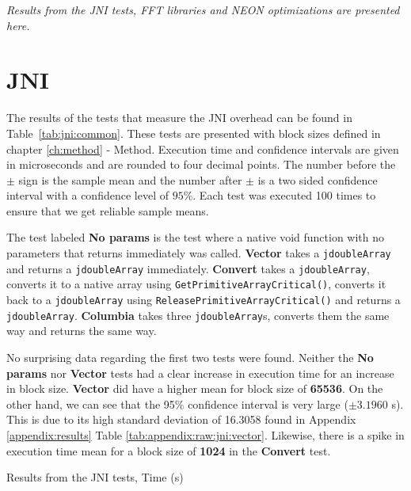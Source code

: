 \textit{Results from the JNI tests, FFT libraries and NEON optimizations are presented here.}

\section{JNI}
The results of the tests that measure the JNI overhead can be found in Table~\ref{tab:jni:common}. These tests are presented with block sizes defined in chapter \ref{ch:method} - Method. Execution time and confidence intervals are given in microseconds and are rounded to four decimal points. The number before the $\pm$ sign is the sample mean and the number after $\pm$ is a two sided confidence interval with a confidence level of $95\%$. Each test was executed 100 times to ensure that we get reliable sample means.

The test labeled \textbf{No params} is the test where a native void function with no parameters that returns immediately was called. \textbf{Vector} takes a \texttt{jdoubleArray} and returns a \texttt{jdoubleArray} immediately. \textbf{Convert} takes a \texttt{jdoubleArray}, converts it to a native array using \texttt{GetPrimitiveArrayCritical()}, converts it back to a \texttt{jdoubleArray} using \texttt{ReleasePrimitiveArrayCritical()} and returns a \texttt{jdoubleArray}. \textbf{Columbia} takes three \texttt{jdoubleArray}s, converts them the same way and returns the same way.

No surprising data regarding the first two tests were found. Neither the \textbf{No params} nor \textbf{Vector} tests had a clear increase in execution time for an increase in block size. \textbf{Vector} did have a higher mean for block size of \textbf{65536}. On the other hand, we can see that the 95\% confidence interval is very large ($\pm 3.1960$ \textmu s). This is due to its high standard deviation of 16.3058 found in Appendix \ref{appendix:results} Table \ref{tab:appendix:raw:jni:vector}. Likewise, there is a spike in execution time mean for a block size of \textbf{1024} in the \textbf{Convert} test.



\begin{table}[H]
    \centering
    \caption{Results from the JNI tests, Time (\textmu s)}
    \label{tab:jni:common}
    
\end{table}



